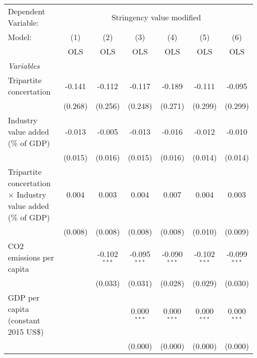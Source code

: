 
\begingroup
\centering
\begin{tabular}{lcccccc}
   \toprule
   Dependent Variable: & \multicolumn{6}{c}{Stringency value modified}\\
   Model:                                                              & (1)     & (2)            & (3)            & (4)            & (5)            & (6)\\  
                                                                       &  OLS    & OLS            & OLS            & OLS            & OLS            & OLS\\  
   \midrule
   \emph{Variables}\\
   Tripartite concertation                                             & -0.141  & -0.112         & -0.117         & -0.189         & -0.111         & -0.095\\   
                                                                       & (0.268) & (0.256)        & (0.248)        & (0.271)        & (0.299)        & (0.299)\\   
   Industry value added (\% of GDP)                                    & -0.013  & -0.005         & -0.013         & -0.016         & -0.012         & -0.010\\   
                                                                       & (0.015) & (0.016)        & (0.015)        & (0.016)        & (0.014)        & (0.014)\\   
   Tripartite concertation $\times$ Industry value added (\% of GDP)   & 0.004   & 0.003          & 0.004          & 0.007          & 0.004          & 0.003\\   
                                                                       & (0.008) & (0.008)        & (0.008)        & (0.008)        & (0.010)        & (0.009)\\   
   CO2 emissions per capita                                            &         & -0.102$^{***}$ & -0.095$^{***}$ & -0.090$^{***}$ & -0.102$^{***}$ & -0.099$^{***}$\\   
                                                                       &         & (0.033)        & (0.031)        & (0.028)        & (0.029)        & (0.030)\\   
   GDP per capita (constant 2015 US\$)                                 &         &                & 0.000$^{***}$  & 0.000$^{***}$  & 0.000$^{***}$  & 0.000$^{***}$\\   
                                                                       &         &                & (0.000)        & (0.000)        & (0.000)        & (0.000)\\   

\end{tabular}
